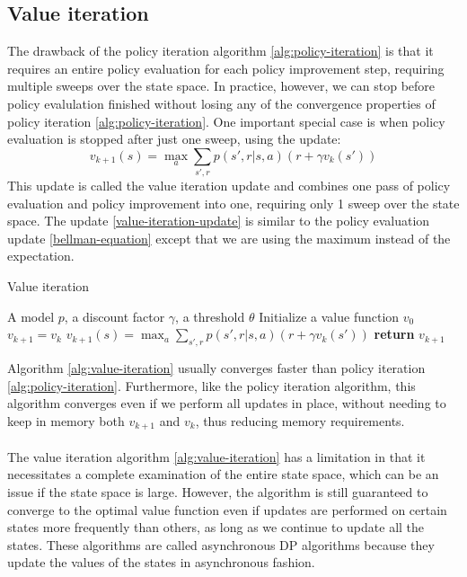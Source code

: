 \subsection{Value iteration}
The drawback of the policy iteration algorithm \ref{alg:policy-iteration} is that it requires an entire policy evaluation for each policy improvement step, requiring multiple sweeps over the state space. In practice, however, we can stop before policy evalulation finished without losing any of the convergence properties of policy iteration \ref{alg:policy-iteration}. One important special case is when policy evaluation is stopped after just one sweep, using the update:
\begin{equation}
    v_{k+1}(s) = \max_a \sum_{s', r} p(s', r | s, a) (r + \gamma v_k(s'))
    \label{value-iteration-update}
\end{equation}
This update is called the value iteration update and combines one pass of policy evaluation and policy improvement into one, requiring only 1 sweep over the state space. The update \ref{value-iteration-update} is similar to the policy evaluation update \ref{bellman-equation} except that we are using the maximum instead of the expectation.
\begin{algorithm}[H]
    \caption{Value iteration}
    \label{alg:value-iteration}
    \begin{algorithmic}[1]
        \Require A model $p$, a discount factor $\gamma$, a threshold $\theta$
        \State Initialize a value function $v_{0}$
            \State $v_{k+1} = v_k$
                \State $v_{k+1}(s) = \max_a \sum_{s', r} p(s', r | s, a) (r + \gamma v_k(s'))$
            \EndFor
                \State \textbf{return} $v_{k+1}$
            \EndIf
        \EndWhile
    \end{algorithmic}
\end{algorithm}
Algorithm \ref{alg:value-iteration} usually converges faster than policy iteration \ref{alg:policy-iteration}. Furthermore, like the policy iteration algorithm, this algorithm converges even if we perform all updates in place, without needing to keep in memory both $v_{k+1}$ and $v_k$, thus reducing memory requirements.\\\\
The value iteration algorithm \ref{alg:value-iteration} has a limitation in that it necessitates a complete examination of the entire state space, which can be an issue if the state space is large. However, the algorithm is still guaranteed to converge to the optimal value function even if updates are performed on certain states more frequently than others, as long as we continue to update all the states. These algorithms are called asynchronous DP algorithms because they update the values of the states in asynchronous fashion.

